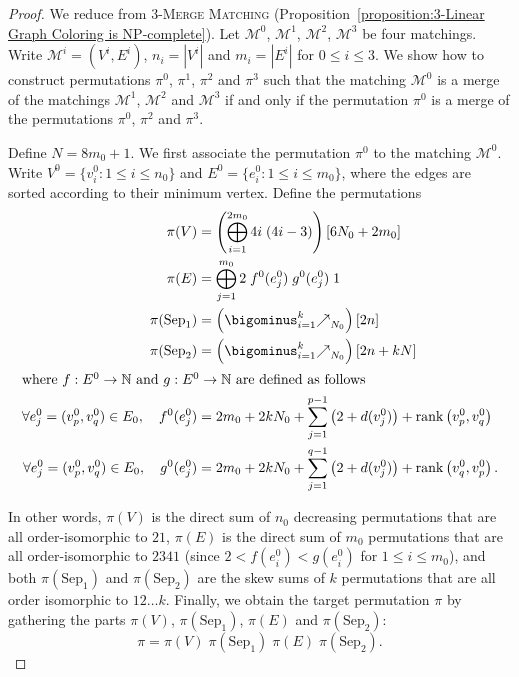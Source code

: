 \begin{proof}
  We reduce from \textsc{$3$-Merge Matching} (Proposition~\ref{proposition:3-Linear Graph Coloring is NP-complete}).
  Let $\mathcal{M}^{0}$, $\mathcal{M}^{1}$, $\mathcal{M}^{2}$, $\mathcal{M}^{3}$ be four matchings. 
  Write $\mathcal{M}^{i} = (V^i, E^i)$,
  $n_i = |V^i|$ and $m_i = |E^i|$ for $0 \leq i \leq 3$.
  We show how to construct permutations $\pi^0$, $\pi^1$, $\pi^2$ and $\pi^3$ such that
  the matching $\mathcal{M}^{0}$ is a merge of the matchings $\mathcal{M}^{1}$, $\mathcal{M}^{2}$ and $\mathcal{M}^{3}$
  if and only if
  the permutation $\pi^0$ is a merge of the permutations $\pi^0$, $\pi^2$ and $\pi^3$.

  Define $N = 8m_0 + 1$.
  We first associate the permutation $\pi^0$ to the matching $\mathcal{M}^{0}$.
  Write $V^0 = \{v^0_i : 1 \leq i \leq n_0\}$ and
  $E^0 = \{e^0_i : 1 \leq i \leq m_0\}$, where the edges are sorted according to their minimum vertex.
  Define the permutations
  \begin{align*}
    \pi(V)
    &=
    \left(\bigoplus_{i=1}^{2m_0} 4i \; (4i-3)\right) [6N_0 + 2m_0]
    \\
    \pi(E)
    &=
    \bigoplus_{j=1}^{m_0} 2 \; f^0(e^0_j) \; g^0(e^0_j) \; 1
    \\
    \pi(\text{Sep}_1)
    &=
    \left(\bigominus_{i=1}^{k} \mathbf{\nearrow}_{N_0}\right) [2n]
    \\
    \pi(\text{Sep}_2)
    &=
    \left(\bigominus_{i=1}^{k} \mathbf{\nearrow}_{N_0}\right) [2n+kN]
    \\
    \intertext{where $f : E^0 \to \mathbb{N}$ and $g : E^0 \to \mathbb{N}$
    are defined as follows}
    \forall e^0_j = (v^0_p, v^0_q) \in E_0,\quad f^0(e^0_j)
    &=
    2m_0 + 2kN_0 + \sum_{j=1}^{p-1}\left(2+d(v^0_j)\right) + \RANK\left(v^0_p, v^0_q\right)
    \\
    \forall e^0_j = (v^0_p, v^0_q) \in E_0,\quad g^0(e^0_j)
    &=
    2m_0 + 2kN_0 + \sum_{j=1}^{q-1}\left(2+d(v^0_j)\right) + \RANK\left(v^0_q, v^0_p\right)\text{.}
    \end{align*}

    In other words,
    $\pi(V)$ is the direct sum of $n_0$ decreasing permutations
    that are all order-isomorphic to $21$,
    $\pi(E)$ is the direct sum of $m_0$ permutations that are all
    order-isomorphic to $2341$ (since $2 < f(e^0_i) < g(e^0_i)$
    for $1 \leq i \leq m_0$), and
    both $\pi(\text{Sep}_1)$ and $\pi(\text{Sep}_2)$ are the skew sums
    of $k$ permutations that are all order isomorphic to $12 \dots k$.
    Finally, we obtain the target permutation $\pi$ by gathering the parts
    $\pi(V)$, $\pi(\text{Sep}_1)$, $\pi(E)$ and $\pi(\text{Sep}_2)$:
    $$
      \pi =
      \pi(V)   \;
      \pi(\text{Sep}_1) \;
      \pi(E)   \;
      \pi(\text{Sep}_2)\text{.}
    $$



\end{proof}
